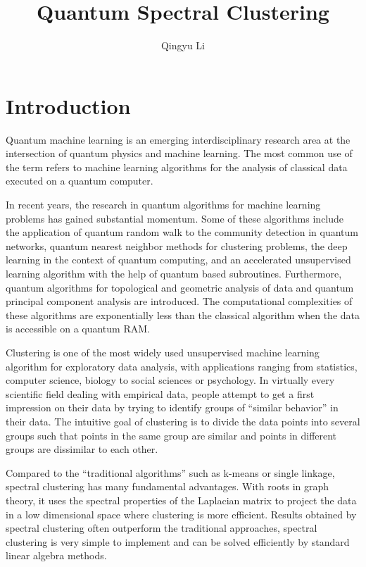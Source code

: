 \documentclass[onecolumn,notitlepage]{revtex4-1}
\begin{document}

\title{Quantum Spectral Clustering}

\author{Qingyu Li}


\maketitle

\section{Introduction}
Quantum machine learning is an emerging interdisciplinary research area at the intersection of quantum physics and machine learning. The most common use of the term refers to machine learning algorithms for the analysis of classical data executed on a quantum computer.

In recent years, the research in quantum algorithms for machine learning problems has gained substantial momentum. Some of these algorithms include the application of quantum random walk to the community detection in quantum networks, quantum nearest neighbor methods for clustering problems, the deep learning in the context of quantum computing, and an accelerated unsupervised learning algorithm with the help of quantum based subroutines. Furthermore, quantum algorithms for topological and geometric analysis of data and quantum principal component analysis are introduced. The computational complexities of these algorithms are exponentially less than the classical algorithm when the data is accessible on a quantum RAM.

Clustering is one of the most widely used unsupervised machine learning algorithm  for exploratory data analysis, with applications ranging from statistics, computer science, biology to social sciences or psychology. In virtually every scientific field dealing with empirical data, people attempt to get a first impression on their data by trying to identify groups of “similar behavior” in their data. The intuitive goal of clustering is to divide the data points into several groups such that points in the same group are similar and points in different groups are dissimilar to each other. 

Compared to the “traditional algorithms” such as k-means or single linkage, spectral clustering has many fundamental advantages. With roots in graph theory, it uses the spectral properties of the Laplacian matrix to project the data in a low dimensional space where clustering is more efficient. Results obtained by spectral clustering often outperform the traditional approaches, spectral clustering is very simple to implement and can be solved efficiently by standard linear algebra methods.
\end{document}
